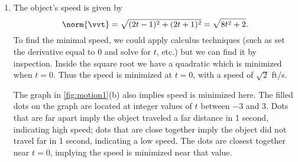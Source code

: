 {\begin{enumerate}
	We can think of acceleration as ``pulling'' the velocity vector in a certain direction. At $t=-1$, the velocity vector points down and to the left; at $t=1$, the velocity vector has been pulled in the $\bracket{2,2}$ direction and is now pointing up and to the right. In \autoref{fig:motion1}(b) we plot more velocity/acceleration vectors, making more clear the effect acceleration has on velocity.
	
	Since $\vat$ is constant in this example, as $t$ grows large \vvt\ becomes almost parallel to \vat. For instance, when $t=10$, $\vec v(10) =\bracket{19,21}$, which is nearly parallel to $\bracket{2,2}$.
	
	\item		The object's speed is given by 
	\[\norm{\vvt} = \sqrt{(2t-1)^2+(2t+1)^2} =\sqrt{8t^2+2}.\] To find the minimal speed, we could apply calculus techniques (such as set the derivative equal to 0 and solve for $t$, etc.) but we can find it by inspection. Inside the square root we have a quadratic which is minimized when $t=0$. Thus the speed is minimized at $t=0$, with a speed of $\sqrt{2}$ ft/s.
	
	The graph in \autoref{fig:motion1}(b) also implies speed is minimized here. The filled dots on the graph are located at integer values of $t$ between $-3$ and 3. Dots that are far apart imply the object traveled a far distance in 1 second, indicating high speed; dots that are close together imply the object did not travel far in 1 second, indicating a low speed. The dots are closest together near $t=0$, implying the speed is minimized near that value.\eoehere
\end{enumerate}}

